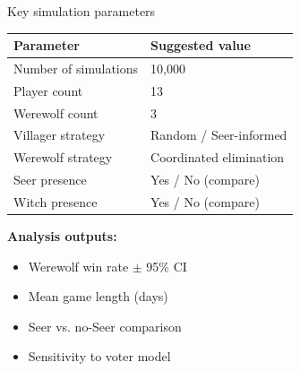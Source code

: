 \documentclass[10pt]{beamer}
\begin{document}
\begin{frame}{Key simulation parameters}
  \begin{center}
    \begin{tabular}{lp{6cm}}
      \hline
      \textbf{Parameter} & \textbf{Suggested value} \\
      \hline
      Number of simulations & 10,000 \\
      Player count & 13 \\
      Werewolf count & 3 \\
      Villager strategy & Random / Seer-informed \\
      Werewolf strategy & Coordinated elimination \\
      Seer presence & Yes / No (compare) \\
      Witch presence & Yes / No (compare) \\
      \hline
    \end{tabular}
  \end{center}

  \vspace{0.5cm}
  \textbf{Analysis outputs:}
  \begin{itemize}
    \item Werewolf win rate $\pm$ 95\% CI
    \item Mean game length (days)
    \item Seer vs. no-Seer comparison
    \item Sensitivity to voter model
  \end{itemize}
\end{frame}


    
    
    
    
\end{document}
